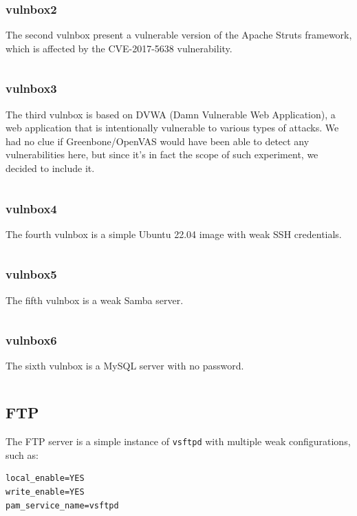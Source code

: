 \subsubsection{vulnbox2}
\label{sec:vulnbox2}
The second vulnbox present a vulnerable version of the 
Apache Struts framework, which is affected by the 
CVE-2017-5638 vulnerability.
\inputminted{yaml}{../project/docker-vulnet/network/vulnbox-2/Dockerfile}

\subsubsection{vulnbox3}
\label{sec:vulnbox3}
The third vulnbox is based on DVWA (Damn Vulnerable Web Application), 
a web application that is intentionally vulnerable 
to various types of attacks.
We had no clue if Greenbone/OpenVAS would have been able to detect any vulnerabilities here,
but since it's in fact the scope of such experiment, we decided to include it.
\inputminted{yaml}{../project/docker-vulnet/network/vulnbox-3/Dockerfile}

\subsubsection{vulnbox4}
\label{sec:vulnbox4}
The fourth vulnbox is a simple Ubuntu 22.04 image 
with weak SSH credentials.
\inputminted{yaml}{../project/docker-vulnet/network/vulnbox-4/Dockerfile}

\subsubsection{vulnbox5}
\label{sec:vulnbox5}
The fifth vulnbox is a weak Samba server.
\inputminted{yaml}{../project/docker-vulnet/network/vulnbox-5/Dockerfile}

\subsubsection{vulnbox6}
\label{sec:vulnbox6}
The sixth vulnbox is a MySQL server with no password.
\inputminted{yaml}{../project/docker-vulnet/network/vulnbox-6/Dockerfile}

\subsection{FTP}
\label{sec:ftp}
The FTP server is a simple instance of \texttt{vsftpd}
with multiple weak configurations, such as:
\begin{verbatim}
local_enable=YES
write_enable=YES
pam_service_name=vsftpd
\end{verbatim}

